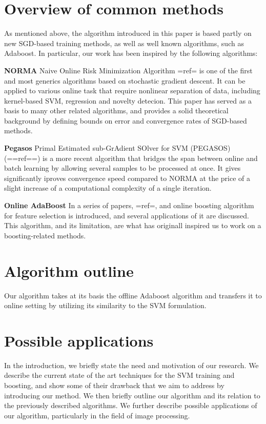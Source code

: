 \section{Overview of common methods} %
As mentioned above, the algorithm introduced in this paper is based partly on new SGD-based training methods, as well as well known algorithms, such as Adaboost. In particular, our work has been inspired by the following algorithms:

{\bf NORMA} Naive Online Risk Minimization Algorithm {{=ref=}} is one of the first and most generics algorithms based on stochastic gradient descent. It can be applied to various online task that require nonlinear separation of data, including kernel-based SVM, regression and novelty detecion. This paper has served as a basis to many other related algorithms, and provides a solid theoretical background by defining bounds on error and convergence rates of SGD-based methods.

{\bf Pegasos } Primal Estimated sub-GrAdient SOlver for SVM (PEGASOS) ({{==ref==}}) is a more recent algorithm that bridges the span between online and batch learning by allowing several samples to be processed at once. It gives significantly iproves convergence speed compared to NORMA at the price of a slight increase of a computational complexity of a single iteration. 

{\bf Online AdaBoost} In a series of papers, {{=ref=}}, and online boosting algorithm for feature selection is introduced, and several applications of it are discussed. This algorithm, and its limitation, are what has originall inspired us to work on a boosting-related methods.


\section{Algorithm outline}

Our algorithm takes at its basis the offline Adaboost algorithm and transfers it to online setting by utilizing its similarity to the SVM formulation. 

\section{Possible applications}
In the introduction, we briefly state the need and motivation of our research. We describe the current state of the art techniques for the SVM training and boosting, and show some of their drawback that we aim to address by introducing our method. We then briefly outline our algorithm and its relation to the previously described algorithms. We further describe possible applications of our algorithm, particularly in the field of image processing.



